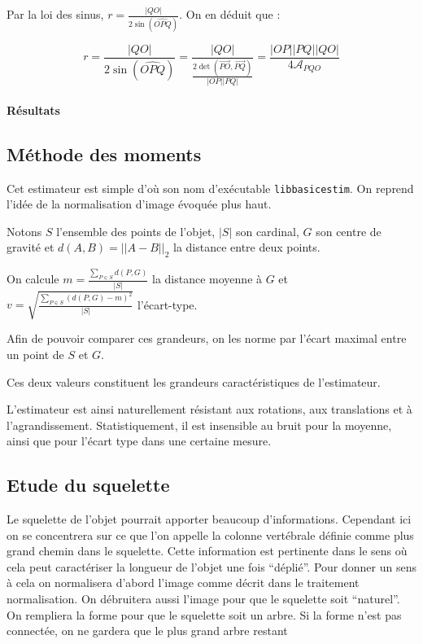 \documentclass{article}
\theoremstyle{definition}
\begin{document}
	  Par la loi des sinus, $r = \frac{|QO|}{2 \sin\left(\widehat{OPQ}\right)}$. On en déduit que :
	  
	  \[ r = \frac{|QO|}{2 \sin\left(\widehat{OPQ}\right)} = \frac{|QO|}{\frac{2 \det\left(\overrightarrow{PO}, \overrightarrow{PQ} \right)}{|OP| |PQ|}} = \frac{|OP| |PQ| |QO|}{4 \mathcal{A}_{PQO}}  \]
	
	\paragraph{Résultats}
  
    
    \subsection{Méthode des moments} %
      Cet estimateur est simple d'où son nom d'exécutable \verb-libbasicestim-. On reprend l'idée de la normalisation d'image évoquée plus haut.
      
      Notons $S$ l'ensemble des points de l'objet, $|S|$ son cardinal, $G$ son centre de gravité et $d(A,B)=||A-B||_2$ la distance entre deux points.
      
      On calcule $m=\frac{\sum_{P\in S}d(P,G)}{|S|}$ la distance moyenne à $G$ et $v=\sqrt{\frac{\sum_{P\in S}\left ( d(P,G) -m\right ) ^2}{|S|}}$ l'écart-type.
      
      Afin de pouvoir comparer ces grandeurs, on les norme par l'écart maximal entre un point de $S$ et $G$.
      
      Ces deux valeurs constituent les grandeurs caractéristiques de l'estimateur.
      
      L'estimateur est ainsi naturellement résistant aux rotations, aux translations et à l'agrandissement. Statistiquement, il est insensible au bruit pour la moyenne, ainsi que pour l'écart type dans une certaine mesure.
    
    \subsection{Etude du squelette} %
    
    Le squelette de l'objet pourrait apporter beaucoup d'informations. Cependant ici on se concentrera sur ce que l'on appelle la colonne vertébrale définie comme plus grand chemin dans le squelette. Cette information est pertinente dans le sens où cela peut caractériser la longueur de l'objet une fois ``déplié''. Pour donner un sens à cela on normalisera d'abord l'image comme décrit dans le traitement normalisation. On débruitera aussi l'image pour que le squelette soit ``naturel''. On rempliera la forme pour que le squelette soit un arbre. Si la forme n'est pas connectée, on ne gardera que le plus grand arbre restant
    
\end{document}
